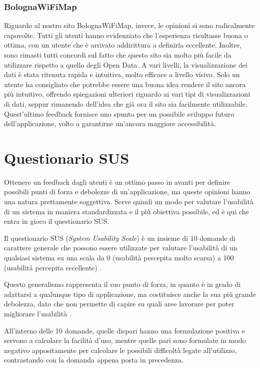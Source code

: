 \subsubsection{BolognaWiFiMap}
Riguardo al nostro sito BolognaWiFiMap, invece, le opinioni si sono radicalmente capovolte. Tutti gli utenti hanno evidenziato che l'esperienza risultasse buona o ottima, con un utente che è arrivato addirittura a definirla eccellente. Inoltre, sono rimasti tutti concordi sul fatto che questo sito sia molto più facile da utilizzare rispetto a quello degli Open Data. A vari livelli, la visualizzazione dei dati è stata ritenuta rapida e intuitiva, molto efficace a livello visivo. Solo un utente ha consigliato che potrebbe essere una buona idea rendere il sito ancora più intuitivo, offrendo spiegazioni ulteriori riguardo ai vari tipi di visualizzazioni di dati, seppur rimanendo dell'idea che già ora il sito sia facilmente utilizzabile. Quest'ultimo feedback fornisce uno spunto per un possibile sviluppo futuro dell'applicazione, volto a garantirne un'ancora maggiore accessibilità.

\section{Questionario SUS}
Ottenere un feedback dagli utenti è un ottimo passo in avanti per definire possibili punti di forza e debolezze di un'applicazione, ma queste opinioni hanno una natura prettamente soggettiva. Serve quindi un modo per valutare l'usabilità di un sistema in maniera standardizzata e il più obiettiva possibile, ed è qui che entra in gioco il questionario SUS.

Il questionario SUS (\textit{System Usability Scale}) è un insieme di 10 domande di carattere generale che possono essere utilizzate per valutare l'usabilità di un qualsiasi sistema su una scala da 0 (usabilità percepita molto scarsa) a 100 (usabilità percepita eccellente) \cite{SUS}.

Questo generalismo rappresenta il suo punto di forza, in quanto è in grado di adattarsi a qualunque tipo di applicazione, ma costituisce anche la sua più grande debolezza, dato che non permette di capire su quali aree lavorare per poter migliorare l'usabilità \cite{SUS}.

All'interno delle 10 domande, quelle dispari hanno una formulazione positiva e servono a calcolare la facilità d'uso, mentre quelle pari sono formulate in modo negativo appositamente per calcolare le possibili difficoltà legate all'utilizzo, contrastando con la domanda appena posta in precedenza.

